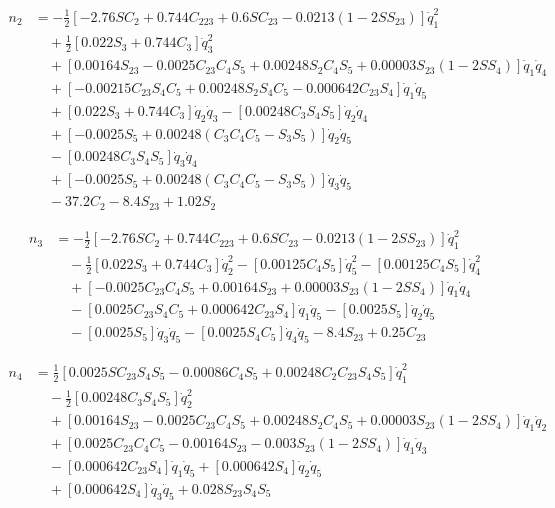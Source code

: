 \documentclass[UTF8]{ctexart}
\begin{document}
\begin{align*}
n_2 &= -\frac{1}{2}[-2.76SC_2 + 0.744C_{223} + 0.6SC_{23} - 0.0213(1 - 2SS_{23})]\dot{q}_1^2 \\
&\quad + \frac{1}{2}[0.022S_3 + 0.744C_3]\dot{q}_3^2 \\
&\quad + [0.00164S_{23} - 0.0025C_{23}C_4S_5 + 0.00248S_2C_4S_5 + 0.00003S_{23}(1 - 2SS_4)]\dot{q}_1\dot{q}_4 \\
&\quad + [-0.00215C_{23}S_4C_5 + 0.00248S_2S_4C_5 - 0.000642C_{23}S_4]\dot{q}_1\dot{q}_5 \\
&\quad + [0.022S_3 + 0.744C_3]\dot{q}_2\dot{q}_3 - [0.00248C_3S_4S_5]\dot{q}_2\dot{q}_4 \\
&\quad + [-0.0025S_5 + 0.00248(C_3C_4C_5 - S_3S_5)]\dot{q}_2\dot{q}_5 \\
&\quad - [0.00248C_3S_4S_5]\dot{q}_3\dot{q}_4 \\
&\quad + [-0.0025S_5 + 0.00248(C_3C_4C_5 - S_3S_5)]\dot{q}_3\dot{q}_5 \\
&\quad - 37.2C_2 - 8.4S_{23} + 1.02S_2
\end{align*}

\begin{align*}
n_3 &= -\frac{1}{2}[-2.76SC_2 + 0.744C_{223} + 0.6SC_{23} - 0.0213(1 - 2SS_{23})]\dot{q}_1^2 \\
&\quad - \frac{1}{2}[0.022S_3 + 0.744C_3]\dot{q}_2^2 - [0.00125C_4S_5]\dot{q}_5^2 - [0.00125C_4S_5]\dot{q}_4^2 \\
&\quad + [-0.0025C_{23}C_4S_5 + 0.00164S_{23} + 0.00003S_{23}(1 - 2SS_4)]\dot{q}_1\dot{q}_4 \\
&\quad - [0.0025C_{23}S_4C_5 + 0.000642C_{23}S_4]\dot{q}_1\dot{q}_5 - [0.0025S_5]\dot{q}_2\dot{q}_5 \\
&\quad - [0.0025S_5]\dot{q}_3\dot{q}_5 - [0.0025S_4C_5]\dot{q}_4\dot{q}_5 - 8.4S_{23} + 0.25C_{23}
\end{align*}

\begin{align*}
n_4 &= \frac{1}{2}[0.0025SC_{23}S_4S_5 - 0.00086C_4S_5 + 0.00248C_2C_{23}S_4S_5]\dot{q}_1^2 \\
&\quad - \frac{1}{2}[0.00248C_3S_4S_5]\dot{q}_2^2 \\
&\quad + [0.00164S_{23} - 0.0025C_{23}C_4S_5 + 0.00248S_2C_4S_5 + 0.00003S_{23}(1 - 2SS_4)]\dot{q}_1\dot{q}_2 \\
&\quad + [0.0025C_{23}C_4C_5 - 0.00164S_{23} - 0.003S_{23}(1 - 2SS_4)]\dot{q}_1\dot{q}_3 \\
&\quad - [0.000642C_{23}S_4]\dot{q}_1\dot{q}_5 + [0.000642S_4]\dot{q}_2\dot{q}_5 \\
&\quad + [0.000642S_4]\dot{q}_3\dot{q}_5 + 0.028S_{23}S_4S_5
\end{align*}
\end{document}
